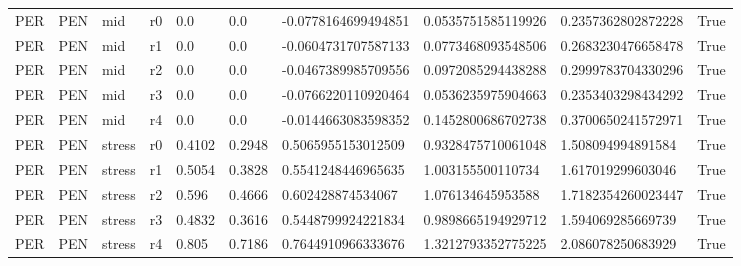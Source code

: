 \begin{landscape}
\begin{longtable}{llllllllll}
PER & PEN & mid & r0 & 0.0 & 0.0 & -0.0778164699494851 & 0.0535751585119926 & 0.2357362802872228 & True \\
PER & PEN & mid & r1 & 0.0 & 0.0 & -0.0604731707587133 & 0.0773468093548506 & 0.2683230476658478 & True \\
PER & PEN & mid & r2 & 0.0 & 0.0 & -0.0467389985709556 & 0.0972085294438288 & 0.2999783704330296 & True \\
PER & PEN & mid & r3 & 0.0 & 0.0 & -0.0766220110920464 & 0.0536235975904663 & 0.2353403298434292 & True \\
PER & PEN & mid & r4 & 0.0 & 0.0 & -0.0144663083598352 & 0.1452800686702738 & 0.3700650241572971 & True \\
PER & PEN & stress & r0 & 0.4102 & 0.2948 & 0.5065955153012509 & 0.9328475710061048 & 1.508094994891584 & True \\
PER & PEN & stress & r1 & 0.5054 & 0.3828 & 0.5541248446965635 & 1.003155500110734 & 1.617019299603046 & True \\
PER & PEN & stress & r2 & 0.596 & 0.4666 & 0.602428874534067 & 1.076134645953588 & 1.7182354260023447 & True \\
PER & PEN & stress & r3 & 0.4832 & 0.3616 & 0.5448799924221834 & 0.9898665194929712 & 1.594069285669739 & True \\
PER & PEN & stress & r4 & 0.805 & 0.7186 & 0.7644910966333676 & 1.3212793352775225 & 2.086078250683929 & True \\
\bottomrule
\end{longtable}
\end{landscape}

